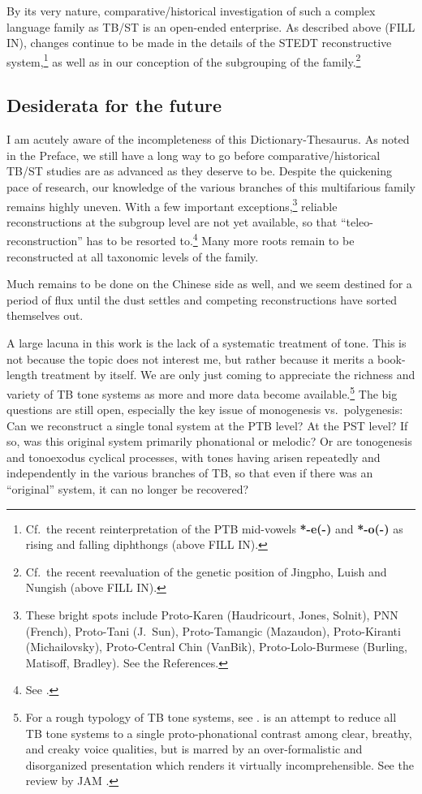 By its very nature, comparative/historical investigation of such a complex language family as TB/ST is an open-ended enterprise. As described above (FILL IN), changes continue to be made in the details of the STEDT reconstructive system,\footnote{Cf.\ the recent reinterpretation of the PTB mid-vowels \textbf{*-e(-)} and \textbf{*-o(-)} as rising and falling diphthongs (above FILL IN).} as well as in our conception of the subgrouping of the family.\footnote{Cf.\ the recent reevaluation of the genetic position of Jingpho, Luish and Nungish (above FILL IN).}

\subsection{Desiderata for the future}

I am acutely aware of the incompleteness of this Dictionary-Thesaurus. As noted in the Preface, we still have a long way to go before comparative/historical TB/ST studies are as advanced as they deserve to be. Despite the quickening pace of research, our knowledge of the various branches of this multifarious family remains highly uneven. With a few important exceptions,\footnote{These bright spots include Proto-Karen (Haudricourt, Jones, Solnit), PNN (French), Proto-Tani (J.\ Sun), Proto-Tamangic (Mazaudon), Proto-Kiranti (Michailovsky), Proto-Central Chin (VanBik), Proto-Lolo-Burmese (Burling, Matisoff, Bradley). See the References.} reliable reconstructions at the subgroup level are not yet available, so that “teleo-reconstruction” has to be resorted to.\footnote{See \citealt{PKB-TBT}.} Many more roots remain to be reconstructed at all taxonomic levels of the family.

Much remains to be done on the Chinese side as well, and we seem destined for a period of flux until the dust settles and competing reconstructions have sorted themselves out.

A large lacuna in this work is the lack of a systematic treatment of tone. This is not because the topic does not interest me, but rather because it merits a book-length treatment by itself. We are only just coming to appreciate the richness and variety of TB tone systems as more and more data become available.\footnote{For a rough typology of TB tone systems, see \citealt{JAM-TBT}. \citealt{AW-TBT}is an attempt to reduce all TB tone systems to a single proto-phonational contrast among clear, breathy, and creaky voice qualities, but is marred by an over-formalistic and disorganized presentation which renders it virtually incomprehensible. See the review by JAM \citeyearpar{JAM-PP}.} The big questions are still open, especially the key issue of monogenesis vs.\ polygenesis: Can we reconstruct a single tonal system at the PTB level? At the PST level? If so, was this original system primarily phonational or melodic? Or are tonogenesis and tonoexodus cyclical processes, with tones having arisen repeatedly and independently in the various branches of TB, so that even if there was an “original” system, it can no longer be recovered?


